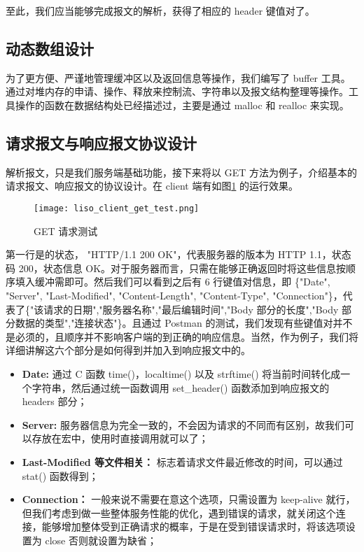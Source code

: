 至此，我们应当能够完成报文的解析，获得了相应的 header 键值对了。

\subsection{动态数组设计}

为了更方便、严谨地管理缓冲区以及返回信息等操作，我们编写了 buffer 工具。通过对堆内存的申请、操作、释放来控制流、字符串以及报文结构整理等操作。工具操作的函数在数据结构处已经描述过，主要是通过 malloc 和 realloc 来实现。

\subsection{请求报文与响应报文协议设计}

解析报文，只是我们服务端基础功能，接下来将以 GET 方法为例子，介绍基本的请求报文、响应报文的协议设计。在 client 端有如图\ref{fig:liso_client_get_test} 的运行效果。

\begin{figure}
  \centering
  \texttt{[image: liso\_client\_get\_test.png]}
  \caption{GET 请求测试}\label{fig:liso_client_get_test}
\end{figure}

第一行是的状态， "HTTP/1.1 200 OK"，代表服务器的版本为 HTTP 1.1，状态码 200，状态信息 OK。对于服务器而言，只需在能够正确返回时将这些信息按顺序填入缓冲需即可。然后我们可以看到之后有 6 行键值对信息，即 \{"Date", "Server", "Last-Modified", "Content-Length", "Content-Type", "Connection"\}，代表了\{"该请求的日期","服务器名称","最后编辑时间","Body 部分的长度","Body 部分数据的类型","连接状态"\}。且通过 Postman 的测试，我们发现有些键值对并不是必须的，且顺序并不影响客户端的到正确的响应信息。当然，作为例子，我们将详细讲解这六个部分是如何得到并加入到响应报文中的。

\begin{itemize}
  \item \textbf{Date: } 通过 C 函数 time()，localtime() 以及 strftime() 将当前时间转化成一个字符串，然后通过统一函数调用 set\_header() 函数添加到响应报文的 headers 部分；
  \item \textbf{Server: } 服务器信息为完全一致的，不会因为请求的不同而有区别，故我们可以存放在宏中，使用时直接调用就可以了；
  \item \textbf{Last-Modified 等文件相关： } 标志着请求文件最近修改的时间，可以通过 stat() 函数得到；
  \item \textbf{Connection： } 一般来说不需要在意这个选项，只需设置为 keep-alive 就行，但我们考虑到做一些整体服务性能的优化，遇到错误的请求，就关闭这个连接，能够增加整体受到正确请求的概率，于是在受到错误请求时，将该选项设置为 close 否则就设置为缺省；
\end{itemize}

